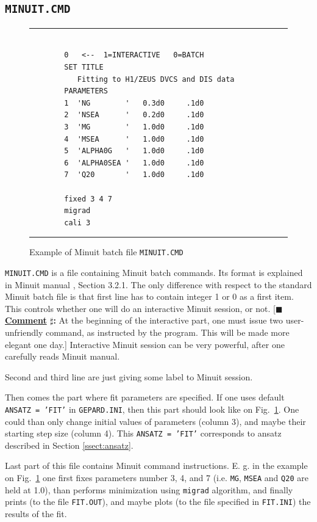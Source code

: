 \documentclass[12pt]{article}
\newcounter{comment}
\newcommand{\comminline}[1]{{%
\refstepcounter{comment}%
\ttfamily\small[$\blacksquare$ \textbf{\underline{Comment}
$\sharp$\thecomment:} #1]}}
\begin{document}
\subsection{\texttt{MINUIT.CMD}}

\begin{figure}[t]
\begin{center}
\hrule
\begin{verbatim}

        0   <--  1=INTERACTIVE   0=BATCH 
        SET TITLE
           Fitting to H1/ZEUS DVCS and DIS data
        PARAMETERS
        1  'NG        '   0.3d0     .1d0
        2  'NSEA      '   0.2d0     .1d0
        3  'MG        '   1.0d0     .1d0 
        4  'MSEA      '   1.0d0     .1d0
        5  'ALPHA0G   '   1.0d0     .1d0
        6  'ALPHA0SEA '   1.0d0     .1d0
        7  'Q20       '   1.0d0     .1d0

        fixed 3 4 7
        migrad
        cali 3

\end{verbatim}
\hrule
\end{center}
\caption{Example of Minuit batch file \texttt{MINUIT.CMD}}
\label{fig:MINUIT.CMD}
\end{figure}

\texttt{MINUIT.CMD} is a file containing Minuit batch commands. Its format is explained in
Minuit manual \cite{Minuit}, Section 3.2.1. The only difference with respect to the
standard Minuit batch file is that first line has to contain integer 1 or 0 as a first
item. This controls whether one will do an interactive Minuit session, or not.
\comminline{At the beginning of the interactive part, one must issue two user-unfriendly
command, as instructed by the program. This will be made more elegant one day.}
Interactive Minuit session can be very powerful, after one carefully reads Minuit manual.

Second and third line are just giving some label to Minuit session.

Then comes the part where fit parameters are specified.
If one uses default \texttt{ANSATZ = 'FIT'} in
\texttt{GEPARD.INI}, then this part should look like on
Fig.~\ref{fig:MINUIT.CMD}. One could than only change initial values of parameters
(column 3), and maybe their starting step size (column 4). This \texttt{ANSATZ = 'FIT'} 
corresponds to ansatz described in Section \ref{ssect:ansatz}.  

Last part of this file contains Minuit command instructions. E. g. in the
example on Fig.~\ref{fig:MINUIT.CMD} one first fixes parameters number 3, 4,
and 7 (i.e. \texttt{MG}, \texttt{MSEA} and \texttt{Q20} are held at 1.0),
than performs minimization using \texttt{migrad} algorithm,
and finally prints (to the file \texttt{FIT.OUT}), and maybe plots (to the file specified in
\texttt{FIT.INI}) the results of the fit.
\end{document}
